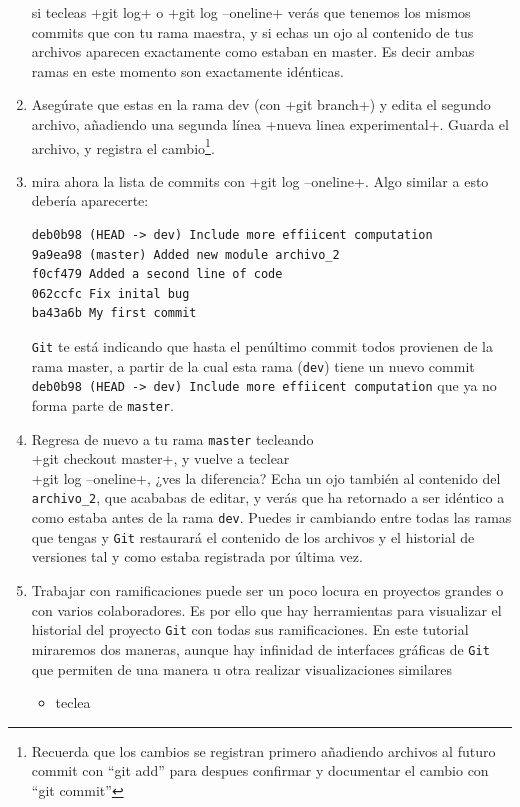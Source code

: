 \documentclass[a5paper,10pt]{article}
\begin{document}
\begin{enumerate}
    si tecleas \cverb+git log+ o \cverb+git log --oneline+ verás que tenemos los mismos commits que con tu rama maestra, y si echas un ojo al contenido de tus archivos aparecen exactamente como estaban en master. Es decir ambas ramas en este momento son exactamente idénticas.
    
    \item Asegúrate que estas en la rama dev (con \cverb+git branch+) y edita el segundo archivo, añadiendo una segunda línea \cverb+nueva linea experimental+. Guarda el archivo, y registra el cambio\footnote{Recuerda que los cambios se registran primero añadiendo archivos al futuro commit con ``git add'' para despues confirmar y documentar el cambio con ``git commit''}.
    
    \item mira ahora la lista de commits con \cverb+git log --oneline+. Algo similar a esto debería aparecerte:
    
    \begin{lstlisting}[style=custom]
deb0b98 (HEAD -> dev) Include more effiicent computation
9a9ea98 (master) Added new module archivo_2
f0cf479 Added a second line of code
062ccfc Fix inital bug
ba43a6b My first commit
    \end{lstlisting}

    \verb+Git+ te está indicando que hasta el penúltimo commit todos provienen de la rama master, a partir de la cual esta rama (\verb+dev+) tiene un nuevo commit\\ 
    \verb+deb0b98 (HEAD -> dev) Include more effiicent computation+ que ya no forma parte de \verb+master+.
    
    \item Regresa de nuevo a tu rama \verb+master+ tecleando \\ 
    \cverb+git checkout master+, y vuelve a teclear\\ 
    \cverb+git log --oneline+, ¿ves la diferencia? Echa un ojo también al contenido del \verb+archivo_2+, que acababas de editar, y verás que ha retornado a ser idéntico a como estaba antes de la rama \verb+dev+. Puedes ir cambiando entre todas las ramas que tengas y \verb+Git+ restaurará el contenido de los archivos y el historial de versiones tal y como estaba registrada por última vez.
    
    \item Trabajar con ramificaciones puede ser un poco locura en proyectos grandes o con varios colaboradores. Es por ello que hay herramientas para visualizar el historial del proyecto \verb+Git+ con todas sus ramificaciones. En este tutorial miraremos dos maneras, aunque hay infinidad de interfaces gráficas de \verb+Git+ que permiten de una manera u otra realizar visualizaciones similares
    \begin{itemize}
     \item teclea
          

\end{itemize}
\end{enumerate}
\end{document}
